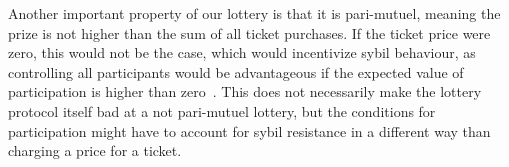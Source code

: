 Another important property of our lottery is that it is pari-mutuel, meaning the prize is not higher than the sum of all ticket purchases. If the ticket price were zero, this would not be the case, which would incentivize sybil behaviour, as controlling all participants would be advantageous if the expected value of participation is higher than zero~\cite{syverson_weakly_1998}. This does not necessarily make the lottery protocol itself bad at a not pari-mutuel lottery, but the conditions for participation might have to account for sybil resistance in a different way than charging a price for a ticket.
